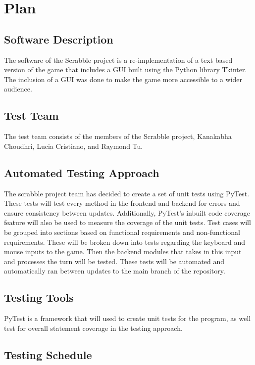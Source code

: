 \documentclass[12pt, titlepage]{article}
\begin{document}
\section{Plan} 
	
\subsection{Software Description}
The software of the Scrabble project is a re-implementation of a text based version of the game that includes a GUI built using the Python library Tkinter. The inclusion of a GUI was done to make the game more accessible to a wider audience.

\subsection{Test Team}
The test team consists of the members of the Scrabble project, Kanakabha Choudhri, Lucia Cristiano, and Raymond Tu.

\subsection{Automated Testing Approach}
The scrabble project team has decided to create a set of unit tests using PyTest. These tests will test every method in the frontend and backend for errors and ensure consistency between updates. Additionally, PyTest's inbuilt code coverage feature will also be used to measure the coverage of the unit tests. Test cases will be grouped into sections based on functional requirements and non-functional requirements. These will be broken down into tests regarding the keyboard and mouse inputs to the game. Then the backend modules that takes in this input and processes the turn will be tested. These tests will be automated and automatically ran between updates to the main branch of the repository. 

\subsection{Testing Tools} %

PyTest is a framework that will used to create unit tests for the program, as well test for overall statement coverage in the testing approach.

\subsection{Testing Schedule} %
		
\end{document}
